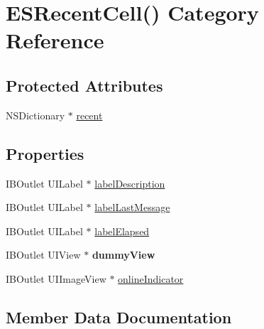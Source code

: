 \hypertarget{category_e_s_recent_cell_07_08}{}\section{E\+S\+Recent\+Cell() Category Reference}
\label{category_e_s_recent_cell_07_08}
\subsection*{Protected Attributes}
\begin{DoxyCompactItemize}
\item 
N\+S\+Dictionary $\ast$ \hyperlink{category_e_s_recent_cell_07_08_af25d1eada427c8d49c7f0a00a1ec78f2}{recent}
\end{DoxyCompactItemize}
\subsection*{Properties}
\begin{DoxyCompactItemize}
\item 
I\+B\+Outlet U\+I\+Label $\ast$ \hyperlink{category_e_s_recent_cell_07_08_a6936efe55d01cb7eedba8eb650ef9d78}{label\+Description}
\item 
I\+B\+Outlet U\+I\+Label $\ast$ \hyperlink{category_e_s_recent_cell_07_08_a88a3b6916e4e963618de5cc159ffc675}{label\+Last\+Message}
\item 
I\+B\+Outlet U\+I\+Label $\ast$ \hyperlink{category_e_s_recent_cell_07_08_abb8e3fcc95b70fa597388a4abfb5e8fc}{label\+Elapsed}
\item 
\hypertarget{category_e_s_recent_cell_07_08_afad44b4da51c897c6b0165b0505aa5ac}{}I\+B\+Outlet U\+I\+View $\ast$ {\bfseries dummy\+View}\label{category_e_s_recent_cell_07_08_afad44b4da51c897c6b0165b0505aa5ac}

\item 
I\+B\+Outlet U\+I\+Image\+View $\ast$ \hyperlink{category_e_s_recent_cell_07_08_a8a1973c8e2b5e6709d700ac30daed557}{online\+Indicator}
\end{DoxyCompactItemize}


\subsection{Member Data Documentation}
\hypertarget{category_e_s_recent_cell_07_08_af25d1eada427c8d49c7f0a00a1ec78f2}{}
